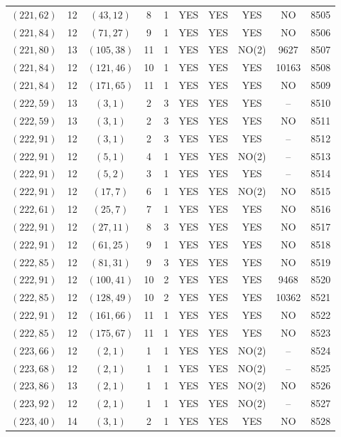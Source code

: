 \begin{longtable}{|c|c|c|c|c|c|c|c|c|c|}
$(221, 62)$ & 12 & $(43, 12)$ & 8 & 1 & YES & YES & YES & NO & 8505\\
$(221, 84)$ & 12 & $(71, 27)$ & 9 & 1 & YES & YES & YES & NO & 8506\\
$(221, 80)$ & 13 & $(105, 38)$ & 11 & 1 & YES & YES & NO(2) & 9627 & 8507\\
$(221, 84)$ & 12 & $(121, 46)$ & 10 & 1 & YES & YES & YES & 10163 & 8508\\
$(221, 84)$ & 12 & $(171, 65)$ & 11 & 1 & YES & YES & YES & NO & 8509\\
$(222, 59)$ & 13 & $(3, 1)$ & 2 & 3 & YES & YES & YES & -- & 8510\\
$(222, 59)$ & 13 & $(3, 1)$ & 2 & 3 & YES & YES & YES & NO & 8511\\
$(222, 91)$ & 12 & $(3, 1)$ & 2 & 3 & YES & YES & YES & -- & 8512\\
$(222, 91)$ & 12 & $(5, 1)$ & 4 & 1 & YES & YES & NO(2) & -- & 8513\\
$(222, 91)$ & 12 & $(5, 2)$ & 3 & 1 & YES & YES & YES & -- & 8514\\
$(222, 91)$ & 12 & $(17, 7)$ & 6 & 1 & YES & YES & NO(2) & NO & 8515\\
$(222, 61)$ & 12 & $(25, 7)$ & 7 & 1 & YES & YES & YES & NO & 8516\\
$(222, 91)$ & 12 & $(27, 11)$ & 8 & 3 & YES & YES & YES & NO & 8517\\
$(222, 91)$ & 12 & $(61, 25)$ & 9 & 1 & YES & YES & YES & NO & 8518\\
$(222, 85)$ & 12 & $(81, 31)$ & 9 & 3 & YES & YES & YES & NO & 8519\\
$(222, 91)$ & 12 & $(100, 41)$ & 10 & 2 & YES & YES & YES & 9468 & 8520\\
$(222, 85)$ & 12 & $(128, 49)$ & 10 & 2 & YES & YES & YES & 10362 & 8521\\
$(222, 91)$ & 12 & $(161, 66)$ & 11 & 1 & YES & YES & YES & NO & 8522\\
$(222, 85)$ & 12 & $(175, 67)$ & 11 & 1 & YES & YES & YES & NO & 8523\\
$(223, 66)$ & 12 & $(2, 1)$ & 1 & 1 & YES & YES & NO(2) & -- & 8524\\
$(223, 68)$ & 12 & $(2, 1)$ & 1 & 1 & YES & YES & NO(2) & -- & 8525\\
$(223, 86)$ & 13 & $(2, 1)$ & 1 & 1 & YES & YES & NO(2) & NO & 8526\\
$(223, 92)$ & 12 & $(2, 1)$ & 1 & 1 & YES & YES & NO(2) & -- & 8527\\
$(223, 40)$ & 14 & $(3, 1)$ & 2 & 1 & YES & YES & YES & NO & 8528\\

\end{longtable}
